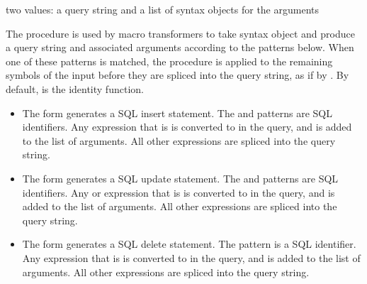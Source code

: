\begin{procedure}\end{procedure}
\returns{} two values: a query string and a list of syntax objects for
the arguments

The  procedure is used by macro transformers to take
syntax object  and produce a query string and associated
arguments according to the patterns below.
When one of these patterns is matched, the  procedure is
applied to the remaining symbols of the input before they are spliced into the
query string, as if by .
By default,  is the identity function.

\begin{itemize}

\item {}

  The  form generates a SQL insert statement. The
   and  patterns are SQL identifiers. Any
   expression that is  is converted
  to  in the query, and  is added to the list of
  arguments. All other expressions are spliced into the query string.

\item {}

  The  form generates a SQL update statement. The
   and  patterns are SQL identifiers. Any
   or  expression that is  is converted to  in the query, and 
  is added to the list of arguments. All other expressions are spliced
  into the query string.

\item {}

  The  form generates a SQL delete statement. The
   pattern is a SQL identifier. Any  expression
  that is  is converted to  in
  the query, and  is added to the list of arguments. All
  other expressions are spliced into the query string.

\end{itemize}

